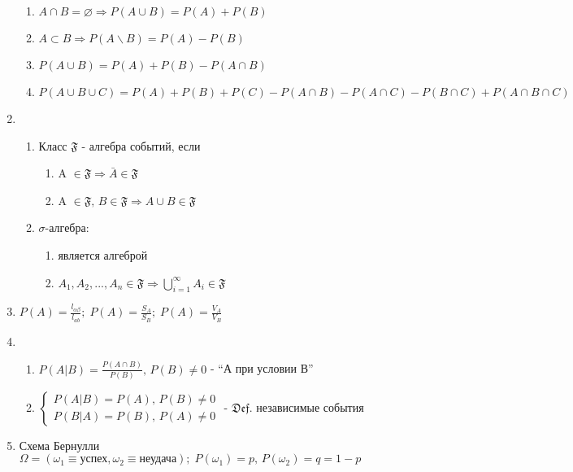 \begin{enumerate}
\begin{enumerate}
      \item $A\cap B=\varnothing \Rightarrow P(A\cup B)=P(A)+P(B)$
      \item $A\subset B\Rightarrow P(A\backslash B)=P(A)-P(B)$
      \item $P(A\cup B)=P(A)+P(B)-P(A\cap B)$
      \item $P(A\cup B\cup C)=P(A)+P(B)+P(C)-P(A\cap B)-P(A\cap C)-P(B\cap C)+P(A\cap B\cap C)$
      \end{enumerate}
\item \begin{enumerate}
      \item Класс $\mathfrak{F}$ - алгебра событий, если
            \begin{enumerate}
            \item A $\in \mathfrak{F} \Rightarrow \bar{A} \in \mathfrak{F}$
            \item A $\in \mathfrak{F},\, B \in \mathfrak{F} \Rightarrow A\cup B\in \mathfrak{F}$
            \end{enumerate}
      \item $\sigma$-алгебра:
            \begin{enumerate}
            \item является алгеброй
            \item $A_1,A_2,...,A_n \in \mathfrak{F} \Rightarrow \bigcup\limits_{i=1}^\infty A_i \in \mathfrak{F}$
            \end{enumerate}
      \end{enumerate}
\item $ P(A) = \frac{l_{\alpha\beta}}{l_{ab}};\;P(A)=\frac{S_A}{S_B};\; P(A) = \frac{V_A}{V_B} $\\
\item \begin{enumerate}
      \item $P(A|B)=\frac{P(A\cap B)}{P(B)},\,P(B)\neq 0$ - ``А при условии В''
      \item $\left\{\begin{array}{l}
            P(A|B)=P(A),\,P(B)\neq 0\\
            P(B|A)=P(B),\,P(A)\neq 0
            \end{array}\right. $ - $ \mathfrak{Def.}$ независимые события
      \end{enumerate}
\item Схема Бернулли\\
      $\Omega = (\omega_1\equiv\text{успех},\omega_2\equiv\text{неудача});\;
      P(\omega_1)=p,\, P(\omega_2)=q=1-p $\\

\end{enumerate}
